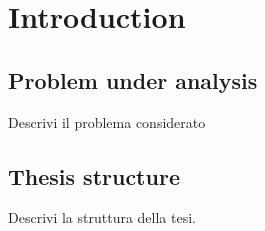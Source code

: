 \chapter{Introduction}
\label{chpr:intro}
\section{Problem under analysis}
Descrivi il problema considerato

\bigskip

\bigskip

\section{Thesis structure}
Descrivi la struttura della tesi.

\bigskip

\bigskip

